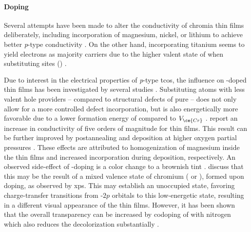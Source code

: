 \paragraph{Doping}
Several attempts have been made to alter the conductivity of chromia thin films deliberately, including incorporation of magnesium, nickel, or lithium to achieve better \textit{p}-type conductivity
    \cite{farrell2015}.
On the other hand, incorporating titanium seems to yield electrons as majority carriers 
    \cite{holt1994}
due to the higher valent state of  when substituting  sites ()
    \cite{kofstad1980}.

Due to interest in the electrical properties of \textit{p}-type \glspl{tco}, the influence on -doped  thin films has been investigated by several studies
    \cite{holt1994,uekawa1996,arca2011,arca2013,farrell2015,arca2017,kehoe2016}.
Substituting  atoms with less valent hole providers -- compared to structural defects of pure  -- does not only allow for a more controlled defect incorporation, but is also energetically more favorable due to a lower formation energy of  compared to $V_{\ce{Cr}}$
    \cite{kehoe2016}.
\textcite{uekawa1996} report an increase in conductivity of five orders of magnitude for  thin films.
This result can be further improved by postannealing
    \cite{farrell2015}
and deposition at higher oxygen partial pressures
    \cite{holt1994,farrell2015}.
These effects are attributed to homogenization of magnesium inside the thin films and increased  incorporation during deposition, respectively.
An observed side-effect of -doping is a color change to a brownish tint
    \cite{uekawa1996,arca2013}.
\textcite{uekawa1996} discuss that this may be the result of a mixed valence state of chromium ( or ), formed upon doping, as observed by \gls{xps}.
This may establish an unoccupied state, favoring charge-transfer transitions from -$2p$ orbitals to this low-energetic state, resulting in a different visual appearance of the thin films.
However, it has been shown that the overall transparency can be increased by codoping of  with nitrogen which also reduces the decolorization substantially
    \cite{arca2011,arca2013}.